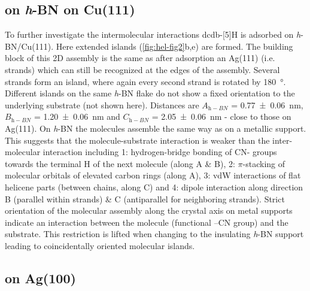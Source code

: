 \subsection{on \textit{h}-BN on Cu(111)}
To further investigate the intermolecular interactions dcdb-[5]H is adsorbed on \textit{h}-BN/Cu(111). Here extended islands (\autoref{fig:hel-fig2}b,e) are formed. The building block of this 2D assembly is the same as after adsorption an Ag(111) (i.e. strands) which can still be recognized at the edges of the assembly. Several strands form an island, where again every second strand is rotated by \SI{180}{\degree}. Different islands on the same \textit{h}-BN flake do not show a fixed orientation to the underlying substrate (not shown here). Distances are $A_{\textit{h}-BN}$ = \SI{0.77 \pm 0.06}{\nano \meter}, $B_{\textit{h}-BN}$ = \SI{1.20 \pm 0.06}{\nano \meter} and $C_{\textit{h}-BN}$ = \SI{2.05 \pm 0.06}{\nano \meter} - close to those on Ag(111). On \textit{h}-BN the molecules assemble the same way as on a metallic support. This suggests that the molecule-substrate interaction is weaker than the inter-molecular interaction including 1: hydrogen-bridge bonding of CN- groups towards the terminal H of the next molecule (along A \& B), 2: $\pi$-stacking of molecular orbitals of elevated carbon rings (along A), 3: vdW interactions of flat helicene parts (between chains, along C) and 4: dipole interaction along direction B (parallel within strands) \& C (antiparallel for neighboring strands).  Strict orientation of the molecular assembly along the crystal axis on metal supports indicate an interaction between the molecule (functional –CN group) and the substrate. This restriction is lifted when changing to the insulating \textit{h}-BN support leading to coincidentally oriented molecular islands.

\subsection{on Ag(100)}


